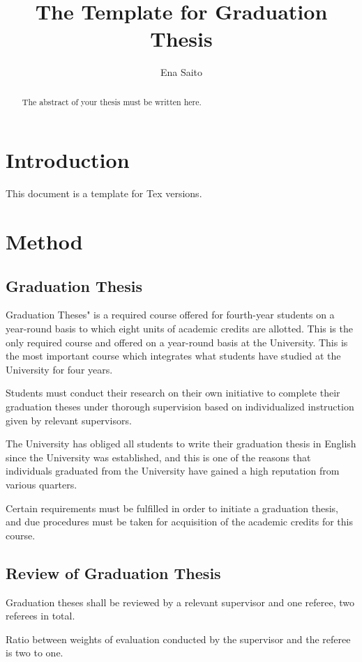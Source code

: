 \documentclass[ams]{U-AizuGT}
\author{Ena Saito}
\title{The Template for Graduation Thesis}
\begin{document}
	\maketitle
	\begin{abstract}
		The abstract of your thesis must be written here.
	\end{abstract}
	
	\section{Introduction}
		This document is a template for Tex versions.
	
	\section{Method}
		\subsection{Graduation Thesis}
			Graduation Theses" is a required course offered for fourth-year students on a year-round basis to which eight units of academic credits are allotted. This is the only required course and offered on a year-round basis at the University. This is the most important course which integrates what students have studied at the University for four years.
			
			Students must conduct their research on their own initiative to complete their graduation theses under thorough supervision based on individualized instruction given by relevant supervisors.
			
			The University has obliged all students to write their graduation thesis in English since the University was established, and this is one of the reasons that individuals graduated from the University have gained a high reputation from various quarters.
			
			Certain requirements must be fulfilled in order to initiate a graduation thesis, and due procedures must be taken for acquisition of the academic credits for this course.
			
		\subsection{Review of Graduation Thesis}
			Graduation theses shall be reviewed by a relevant supervisor and one referee, two referees in total.
			
			Ratio between weights of evaluation conducted by the supervisor and the referee is two to one.
			
\end{document}
